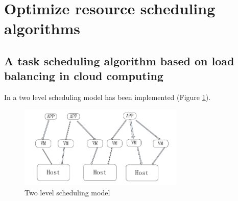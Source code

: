 %
%
%



\section{Optimize resource scheduling algorithms}

\subsection{A task scheduling algorithm based on load balancing in cloud computing}

In \cite{fang2010task} a two level scheduling model has been implemented (Figure \ref{fig:two_level_resource_scheduling}). 

\begin{figure}[htbp]
	\centering
		\includegraphics[width=0.7\textwidth]{figures/state_of_the_art/two_level_resource_scheduling.PNG}
	\caption{Two level scheduling model \cite{fang2010task}}
	\label{fig:two_level_resource_scheduling}
\end{figure}

